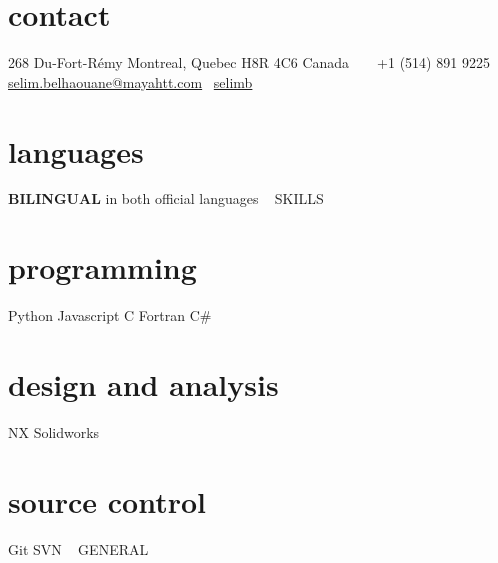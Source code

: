 \documentclass[]{friggeri-cv-mod} %
\newcommand\CC{C\nolinebreak[4]\hspace{-.05em}\raisebox{.4ex}{\relsize{-2}{\textbf{++}}}}
\begin{document}

\begin{aside} %
\section{contact}
268 Du-Fort-Rémy
Montreal, Quebec
H8R 4C6
Canada
~
\Mobilefone ~ +1 (514) 891 9225
\Letter ~ \href{mailto:selim.belhaouane@mayahtt.com}{\small selim.belhaouane@mayahtt.com}
{\larger\FA\faGithub}~\href{https://github.com/selimb}{\small selimb} %
%
\section{languages}
\textbf{BILINGUAL} in both official languages
~
{\LARGE SKILLS}
\section{programming}
Python
Javascript
\CC
Fortran
C\#
\section{design and analysis}
NX
Solidworks
\section{source control}
Git
SVN
%
~
{\LARGE GENERAL}

\end{aside}
\end{document}
